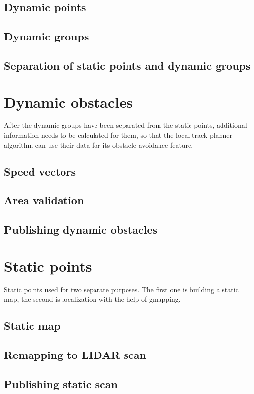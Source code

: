 \subsection{Dynamic points}


\subsection{Dynamic groups}


\subsection{Separation of static points and dynamic groups}


\section{Dynamic obstacles}
After the dynamic groups have been separated from the static points, additional information needs to be calculated for them, so that the local track planner algorithm can use their data for its obstacle-avoidance feature.

\subsection{Speed vectors}


\subsection{Area validation}


\subsection{Publishing dynamic obstacles}


\section{Static points}
Static points used for two separate purposes. The first one is building a static map, the second is localization with the help of gmapping.

\subsection{Static map}


\subsection{Remapping to LIDAR scan}


\subsection{Publishing static scan}
